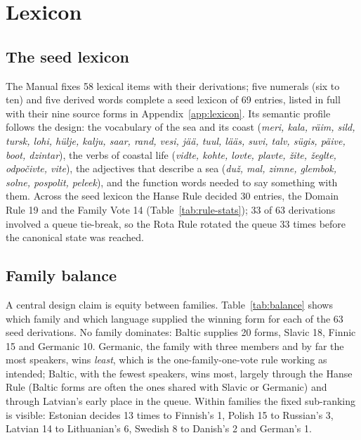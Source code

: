 \section{Lexicon}\label{sec:lexicon}

\subsection{The seed lexicon}
The Manual fixes 58 lexical items with their derivations; five numerals (six to ten) and five derived words complete a seed lexicon of 69 entries, listed in full with their nine source forms in Appendix~\ref{app:lexicon}. Its semantic profile follows the design: the vocabulary of the sea and its coast (\emph{meri, kala, räim, sild, tursk, lohi, hülje, kalju, saar, rand, vesi, jää, tuul, lääs, suvi, talv, sügis, päive, boot, dzintar}), the verbs of coastal life (\emph{vidte, kohte, lovte, plavte, žite, žeglte, odpočivte, vite}), the adjectives that describe a sea (\emph{duž, mal, zimne, glembok, solne, pospolit, peleek}), and the function words needed to say something with them. Across the seed lexicon the Hanse Rule decided 30 entries, the Domain Rule 19 and the Family Vote 14 (Table~\ref{tab:rule-stats}); 33 of 63 derivations involved a queue tie-break, so the Rota Rule rotated the queue 33 times before the canonical state was reached.

\subsection{Family balance}
A central design claim is equity between families. Table~\ref{tab:balance} shows which family and which language supplied the winning form for each of the 63 seed derivations. No family dominates: Baltic supplies 20 forms, Slavic 18, Finnic 15 and Germanic 10. Germanic, the family with three members and by far the most speakers, wins \emph{least}, which is the one-family-one-vote rule working as intended; Baltic, with the fewest speakers, wins most, largely through the Hanse Rule (Baltic forms are often the ones shared with Slavic or Germanic) and through Latvian's early place in the queue. Within families the fixed sub-ranking is visible: Estonian decides 13 times to Finnish's 1, Polish 15 to Russian's 3, Latvian 14 to Lithuanian's 6, Swedish 8 to Danish's 2 and German's 1.

